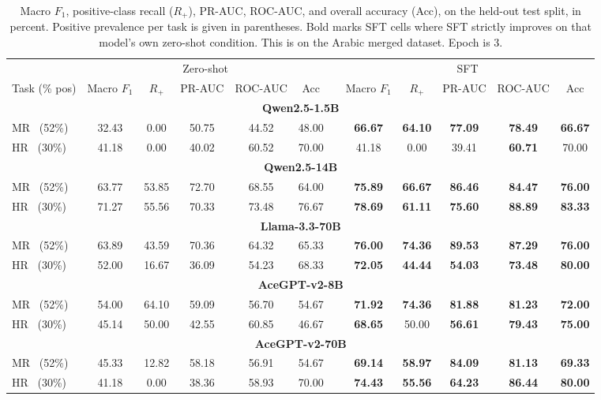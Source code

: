 \begin{table}[!htbp]
\centering
\caption{Macro $F_1$, positive-class recall ($R_{+}$), PR-AUC, ROC-AUC,
and overall accuracy (Acc), on the held-out test split, in percent. Positive prevalence
per task is given in parentheses. Bold marks SFT cells where
SFT strictly improves on that model's own zero-shot condition. This is on the Arabic merged dataset. Epoch is 3.}
\label{tab:llm-results-merged-ar-ep3}
\setlength{\tabcolsep}{5pt}
\small
\begin{tabular}{l ccccc c ccccc}
\toprule
 & \multicolumn{5}{c}{Zero-shot} & & \multicolumn{5}{c}{SFT} \\
\cmidrule(lr){2-6}\cmidrule(lr){8-12}
Task (\% pos)
 & Macro $F_1$ & $R_{+}$ & PR-AUC & ROC-AUC & Acc & & Macro $F_1$ & $R_{+}$ & PR-AUC & ROC-AUC & Acc \\
\midrule
\multicolumn{12}{c}{\textbf{Qwen2.5-1.5B}} \\
\midrule
MR \ (52\%) & 32.43 & 0.00 & 50.75 & 44.52 & 48.00 & & \textbf{66.67} & \textbf{64.10} & \textbf{77.09} & \textbf{78.49} & \textbf{66.67} \\
HR \ (30\%) & 41.18 & 0.00 & 40.02 & 60.52 & 70.00 & & 41.18 & 0.00 & 39.41 & \textbf{60.71} & 70.00 \\
\midrule
\midrule
\multicolumn{12}{c}{\textbf{Qwen2.5-14B}} \\
\midrule
MR \ (52\%) & 63.77 & 53.85 & 72.70 & 68.55 & 64.00 & & \textbf{75.89} & \textbf{66.67} & \textbf{86.46} & \textbf{84.47} & \textbf{76.00} \\
HR \ (30\%) & 71.27 & 55.56 & 70.33 & 73.48 & 76.67 & & \textbf{78.69} & \textbf{61.11} & \textbf{75.60} & \textbf{88.89} & \textbf{83.33} \\
\midrule
\midrule
\multicolumn{12}{c}{\textbf{Llama-3.3-70B}} \\
\midrule
MR \ (52\%) & 63.89 & 43.59 & 70.36 & 64.32 & 65.33 & & \textbf{76.00} & \textbf{74.36} & \textbf{89.53} & \textbf{87.29} & \textbf{76.00} \\
HR \ (30\%) & 52.00 & 16.67 & 36.09 & 54.23 & 68.33 & & \textbf{72.05} & \textbf{44.44} & \textbf{54.03} & \textbf{73.48} & \textbf{80.00} \\
\midrule
\midrule
\multicolumn{12}{c}{\textbf{AceGPT-v2-8B}} \\
\midrule
MR \ (52\%) & 54.00 & 64.10 & 59.09 & 56.70 & 54.67 & & \textbf{71.92} & \textbf{74.36} & \textbf{81.88} & \textbf{81.23} & \textbf{72.00} \\
HR \ (30\%) & 45.14 & 50.00 & 42.55 & 60.85 & 46.67 & & \textbf{68.65} & 50.00 & \textbf{56.61} & \textbf{79.43} & \textbf{75.00} \\
\midrule
\midrule
\multicolumn{12}{c}{\textbf{AceGPT-v2-70B}} \\
\midrule
MR \ (52\%) & 45.33 & 12.82 & 58.18 & 56.91 & 54.67 & & \textbf{69.14} & \textbf{58.97} & \textbf{84.09} & \textbf{81.13} & \textbf{69.33} \\
HR \ (30\%) & 41.18 & 0.00 & 38.36 & 58.93 & 70.00 & & \textbf{74.43} & \textbf{55.56} & \textbf{64.23} & \textbf{86.44} & \textbf{80.00} \\
\bottomrule
\end{tabular}
\end{table}

